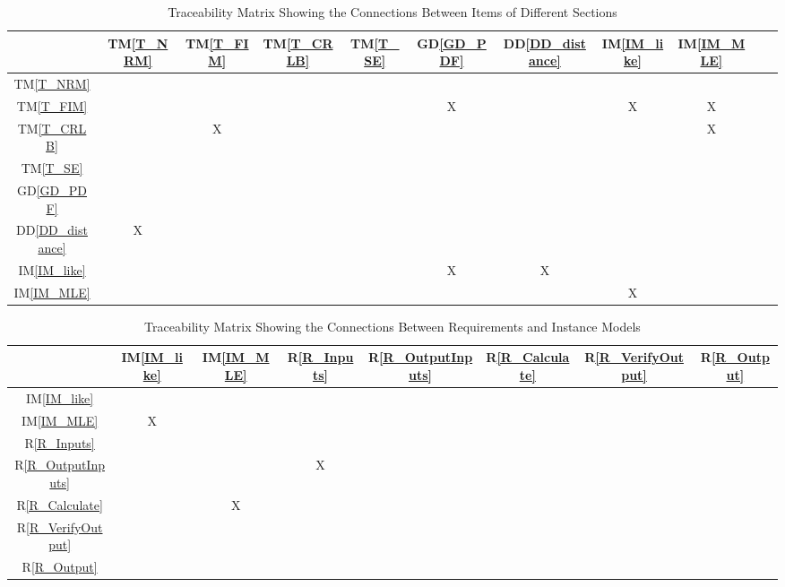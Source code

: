 \documentclass[12pt]{article}
\newcommand{\dref}[1]{GD\ref{#1}}
\newcommand{\ddref}[1]{DD\ref{#1}}
\newcommand{\tref}[1]{TM\ref{#1}}
\newcommand{\iref}[1]{IM\ref{#1}}
\newcommand{\rref}[1]{R\ref{#1}}
\begin{document}
\begin{table}[h!]
\centering
\begin{tabular}{|c|c|c|c|c|c|c|c|c|c|c|}
\hline        
	& \tref{T_NRM}& \tref{T_FIM}& \tref{T_CRLB}& \tref{T_SE} & \dref{GD_PDF}& \ddref{DD_distance} & \iref{IM_like} & \iref{IM_MLE}\\
\hline
\tref{T_NRM}         & & & & & & & & \\ \hline
\tref{T_FIM}         & & & & & X& &X &X \\ \hline
\tref{T_CRLB}        & & X& & & & & & X\\ \hline
\tref{T_SE}          & & & & & & & &  \\ \hline
\dref{GD_PDF}        & & & & & & & & \\ \hline
\ddref{DD_distance}  & X& & & & & & & \\ \hline
\iref{IM_like}       & & & & &X &X & & \\ \hline
\iref{IM_MLE}        & & & & & & &X &\\
\hline
\end{tabular}
\caption{Traceability Matrix Showing the Connections Between Items of Different Sections}
\label{Table:trace}
\end{table}

\begin{table}[h!]
\centering
\begin{tabular}{|c|c|c|c|c|c|c|c|}
\hline
	& \iref{IM_like}& \iref{IM_MLE}& \rref{R_Inputs}& \rref{R_OutputInputs}& \rref{R_Calculate}& \rref{R_VerifyOutput}& \rref{R_Output} \\
\hline
\iref{IM_like}          & & & & & & & \\ \hline
\iref{IM_MLE}           & X& & & & & & \\ \hline
\rref{R_Inputs}         & & & & & & & \\ \hline
\rref{R_OutputInputs}   & & & X& & & & \\ \hline
\rref{R_Calculate}      & & X& & & & & \\ \hline
\rref{R_VerifyOutput}   & & & & & & & \\ \hline
\rref{R_Output}         & & & & & & & \\
\hline
\end{tabular}
\caption{Traceability Matrix Showing the Connections Between Requirements and Instance Models}
\label{Table:R_trace}
\end{table}
\end{document}
